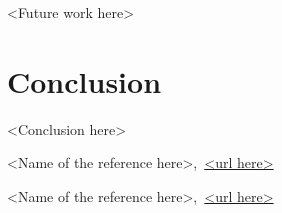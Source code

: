 \documentclass[12pt,a4paper]{report}
\begin{document}
<Future work here>


\chapter{Conclusion}

<Conclusion here>




\cleardoublepage
{}
{}
\begin{thebibliography}{99}

<Name of the reference here>,\ \url{<url here>}

<Name of the reference here>,\ \url{<url here>}

\end{thebibliography}
\end{document}
